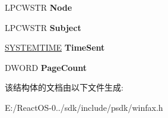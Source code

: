 \begin{DoxyCompactItemize}
L\+P\+C\+W\+S\+TR {\bfseries Node}
\item 
\mbox{\label{struct___f_a_x___c_o_v_e_r_a_g_e___i_n_f_o_w_af6c66f99e219c5779ae9be44dbd51ddb}} 
L\+P\+C\+W\+S\+TR {\bfseries Subject}
\item 
\mbox{\label{struct___f_a_x___c_o_v_e_r_a_g_e___i_n_f_o_w_ad06ccbe721744d13997dc0c3b1e50442}} 
\hyperlink{struct___s_y_s_t_e_m_t_i_m_e}{S\+Y\+S\+T\+E\+M\+T\+I\+ME} {\bfseries Time\+Sent}
\item 
\mbox{\label{struct___f_a_x___c_o_v_e_r_a_g_e___i_n_f_o_w_a32a88d43556eb6b65a75eb314e1303b1}} 
D\+W\+O\+RD {\bfseries Page\+Count}
\end{DoxyCompactItemize}


该结构体的文档由以下文件生成\+:\begin{DoxyCompactItemize}
\item 
E\+:/\+React\+O\+S-\/0../sdk/include/psdk/winfax.\+h\end{DoxyCompactItemize}
